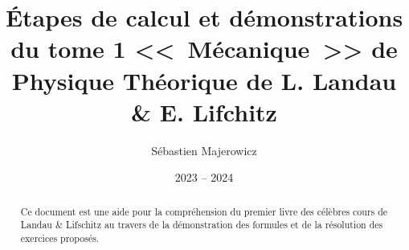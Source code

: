 \documentclass[12pt,a4paper]{report}
\title{\'Etapes de calcul et d\'emonstrations du tome 1 <<~M\'ecanique~>>  de Physique Th\'eorique de L. Landau \&  E. Lifchitz}
\author{S\'ebastien Majerowicz}
\date{2023 -- 2024}
\begin{document}
\maketitle

\begin{abstract}
Ce document est une aide pour la compr\'ehension du premier livre des c\'el\`ebres cours de Landau \& Lifschitz au travers de la d\'emonstration des formules et de la r\'esolution des exercices propos\'es.
\end{abstract}

\tableofcontents
\listoffigures

\clearpage
{}
\setcounter{page}{1}







\appendix






\end{document}

